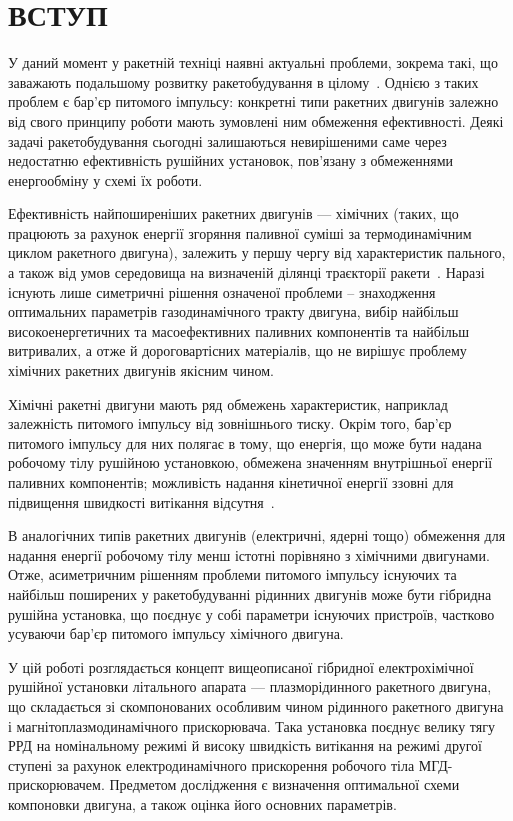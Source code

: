 \chapter*{ВСТУП}%


У даний момент у ракетній техніці наявні актуальні проблеми, зокрема такі, що заважають подальшому розвитку ракетобудування в цілому~\cite{Alemasov}. Однією з таких проблем є бар’єр питомого імпульсу: конкретні типи ракетних двигунів залежно від свого принципу роботи мають зумовлені ним обмеження ефективності. Деякі задачі ракетобудування сьогодні залишаються невирішеними саме через недостатню ефективність рушійних установок, пов'язану з обмеженнями енергообміну у схемі їх роботи.

Ефективність найпоширеніших ракетних двигунів --- хімічних (таких, що працюють за рахунок енергії згоряння паливної суміші за термодинамічним циклом ракетного двигуна), залежить у першу чергу від характеристик пального, а також від умов середовища на визначеній ділянці траєкторії ракети~\cite{Sutton}. Наразі існують лише симетричні рішення означеної проблеми -- знаходження оптимальних параметрів газодинамічного тракту двигуна, вибір найбільш високоенергетичних та масоефективних паливних компонентів та найбільш витривалих, а отже й дороговартісних матеріалів, що не вирішує проблему хімічних ракетних двигунів якісним чином.

Хімічні ракетні двигуни мають ряд обмежень характеристик, наприклад залежність питомого імпульсу від зовнішнього тиску. Окрім того, бар'єр питомого імпульсу для них полягає в тому, що енергія, що може бути надана робочому тілу рушійною установкою, обмежена значенням внутрішньої енергії паливних компонентів; можливість надання кінетичної енергії ззовні для підвищення швидкості витікання відсутня~\cite{Walther}.

В аналогічних типів ракетних двигунів (електричні, ядерні тощо) обмеження для надання енергії робочому тілу менш істотні порівняно з хімічними двигунами. Отже, асиметричним рішенням проблеми питомого імпульсу існуючих та найбільш поширених у ракетобудуванні рідинних двигунів може бути гібридна рушійна установка, що поєднує у собі параметри існуючих пристроїв, частково усуваючи бар'єр питомого імпульсу хімічного двигуна.

У цій роботі розглядається концепт вищеописаної гібридної електрохімічної рушійної установки літального апарата --- плазморідинного ракетного двигуна, що складається зі скомпонованих особливим чином рідинного ракетного двигуна і магнітоплазмодинамічного прискорювача. Така установка поєднує велику тягу РРД на номінальному режимі й високу швидкість витікання на режимі другої ступені за рахунок електродинамічного прискорення робочого тіла МГД-прискорювачем. Предметом дослідження є визначення оптимальної схеми компоновки двигуна, а також оцінка його основних параметрів.


